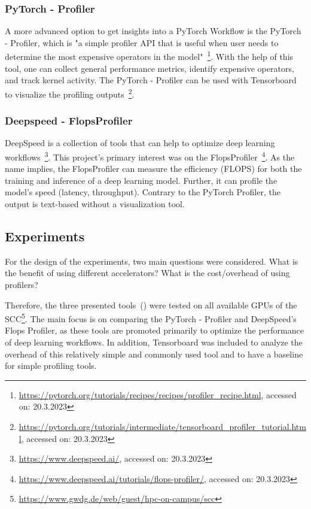 \documentclass[12pt, a4paper, hidelinks]{article}
\begin{document}
\subsubsection{PyTorch - Profiler}
\label{sec:m-pytorch-profiler}

A more advanced option to get insights into a PyTorch Workflow is the PyTorch - Profiler, which is "a simple profiler API that is useful when user needs to determine the most expensive operators in the model"~\footnote{\url{https://pytorch.org/tutorials/recipes/recipes/profiler_recipe.html}, accessed on: 20.3.2023}.
With the help of this tool, one can collect general performance metrics, identify expensive operators, and track kernel activity.
The PyTorch - Profiler can be used with Tensorboard to visualize the profiling outputs~\footnote{\url{https://pytorch.org/tutorials/intermediate/tensorboard_profiler_tutorial.html}, accessed on: 20.3.2023}.


\subsubsection{Deepspeed - FlopsProfiler}
\label{sec:m-FLOPSprofiler}

DeepSpeed is a collection of tools that can help to optimize deep learning workflows~\footnote{\url{https://www.deepspeed.ai/}, accessed on: 20.3.2023}.
This project's primary interest was on the FlopsProfiler~\footnote{\url{https://www.deepspeed.ai/tutorials/flops-profiler/}, accessed on: 20.3.2023}. 
As the name implies, the FlopsProfiler can measure the efficiency (\ac{FLOPS}) for both the training and inference of a deep learning model. Further, it can profile the model's speed (latency, throughput).
Contrary to the PyTorch Profiler, the output is text-based without a visualization tool.


\subsection{Experiments}
\label{sec:m-experiments}

For the design of the experiments, two main questions were considered.
What is the benefit of using different accelerators? What is the cost/overhead of using profilers?

Therefore, the three presented tools~() were tested on all available \ac{GPU}s of the \ac{SCC}\footnote{\url{https://www.gwdg.de/web/guest/hpc-on-campus/scc}}.
The main focus is on comparing the PyTorch - Profiler and DeepSpeed's Flops Profiler, as these tools are promoted primarily to optimize the performance of deep learning workflows. In addition, Tensorboard was included to analyze the overhead of this relatively simple and commonly used tool and to have a baseline for simple profiling tools.
\end{document}
